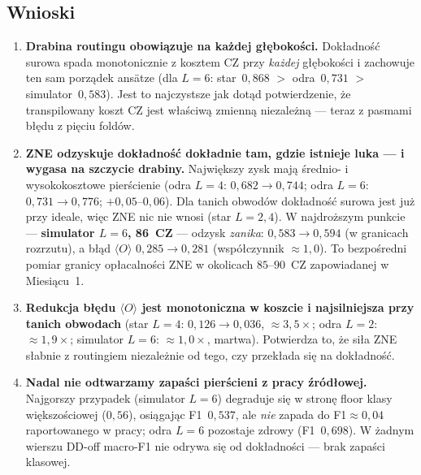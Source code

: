 \documentclass[11pt,a4paper]{article}
\begin{document}
\FloatBarrier

\subsection{Wnioski}

\begin{enumerate}

\item \textbf{Drabina routingu obowiązuje na każdej głębokości.} Dokładność surowa spada
      monotonicznie z kosztem CZ przy \emph{każdej} głębokości i zachowuje ten sam porządek
      ansätze (dla $L=6$: star~$0{,}868$ ${>}$ odra~$0{,}731$ ${>}$ simulator~$0{,}583$). Jest
      to najczystsze jak dotąd potwierdzenie, że transpilowany koszt CZ jest właściwą zmienną
      niezależną --- teraz z pasmami błędu z pięciu foldów.

\item \textbf{ZNE odzyskuje dokładność dokładnie tam, gdzie istnieje luka --- i wygasa na
      szczycie drabiny.} Największy zysk mają średnio- i wysokokosztowe pierścienie
      (odra $L{=}4$: $0{,}682\to0{,}744$; odra $L{=}6$: $0{,}731\to0{,}776$; ${+}0{,}05$--$0{,}06$).
      Dla tanich obwodów dokładność surowa jest już przy ideale, więc ZNE nic nie wnosi
      (star $L{=}2,4$). W najdroższym punkcie --- \textbf{simulator $L{=}6$, 86~CZ} --- odzysk
      \emph{zanika}: $0{,}583\to0{,}594$ (w granicach rozrzutu), a błąd $\langle O\rangle$
      $0{,}285\to0{,}281$ (współczynnik ${\approx}1{,}0$). To bezpośredni pomiar granicy
      opłacalności ZNE w okolicach $85$--$90$~CZ zapowiadanej w Miesiącu~1.

\item \textbf{Redukcja błędu $\langle O\rangle$ jest monotoniczna w koszcie i najsilniejsza przy
      tanich obwodach} (star $L{=}4$: $0{,}126\to0{,}036$, ${\approx}3{,}5\times$; odra $L{=}2$:
      ${\approx}1{,}9\times$; simulator $L{=}6$: ${\approx}1{,}0\times$, martwa). Potwierdza to,
      że siła ZNE słabnie z routingiem niezależnie od tego, czy przekłada się na dokładność.

\item \textbf{Nadal nie odtwarzamy zapaści pierścieni z pracy źródłowej.} Najgorszy przypadek
      (simulator $L{=}6$) degraduje się w stronę floor klasy większościowej ($0{,}56$),
      osiągając F1~$0{,}537$, ale \emph{nie} zapada do F1${\approx}0{,}04$ raportowanego w pracy;
      odra $L{=}6$ pozostaje zdrowy (F1~$0{,}698$). W żadnym wierszu DD-off macro-F1 nie odrywa
      się od dokładności --- brak zapaści klasowej.


\end{enumerate}
\end{document}
